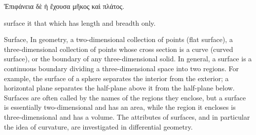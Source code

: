 
\begin{defin}
\textgreek{Ἐπιφάνεια δὲ ἡ ἔχουσα μῆκος καὶ πλάτος.}

 surface it that which has length and breadth only.
\end{defin}

Surface, In geometry, a two-dimensional collection of points (flat surface), a three-dimensional collection of points whose cross section is a curve (curved surface), or the boundary of any three-dimensional solid. In general, a surface is a continuous boundary dividing a three-dimensional space into two regions. For example, the surface of a sphere separates the interior from the exterior; a horizontal plane separates the half-plane above it from the half-plane below. Surfaces are often called by the names of the regions they enclose, but a surface is essentially two-dimensional and has an area, while the region it encloses is three-dimensional and has a volume. The attributes of surfaces, and in particular the idea of curvature, are investigated in differential geometry.

\clearpage